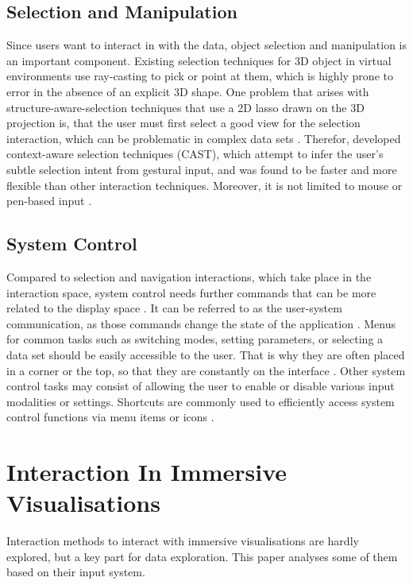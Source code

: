 \subsection{Selection and Manipulation}
\label{subsection:Selection and Manipulation}
Since users want to interact in with the data, object selection and manipulation is an important component. Existing selection techniques for 3D object in virtual environments use ray-casting to pick or point at them, which is highly prone to error in the absence of an explicit 3D shape\autocite[1]{Yu2016}. One problem that arises with structure-aware-selection techniques that use a 2D lasso drawn on the 3D projection is, that the user must first select a good view for the selection interaction, which can be problematic in complex data sets \autocite[1]{Yu2016}. Therefor, \cite{Yu2016} developed context-aware selection techniques (CAST), which attempt to infer the user's subtle selection intent from gestural input, and was found to be faster and more flexible than other interaction techniques. Moreover, it is not limited to mouse or pen-based input \autocite{Yu2016}.

\subsection{System Control}
\label{subsection:System Control}
Compared to selection and navigation interactions, which take place in the interaction space, system control needs further commands that can be more related to the display space \autocite[48]{Cordeil2017}. It can be referred to as the user-system communication, as those commands change the state of the application \autocite[]{Jankowski2013}.
Menus for common tasks such as switching modes, setting parameters, or selecting a data set should be easily accessible to the user. That is why they are often placed in a corner or the top, so that they are constantly on the interface \autocite[885]{Besancon2017}. Other system control tasks may consist of allowing the user to enable or disable various input modalities or settings. Shortcuts are commonly used to efficiently access system control functions via menu items or icons \autocite[]{Jankowski2013}. \newline

\section{Interaction In Immersive Visualisations}
Interaction methods to interact with immersive visualisations are hardly explored, but a key part for data exploration. This paper analyses some of them based on their input system.
\label{section:Interaction Techniques Immersive}

